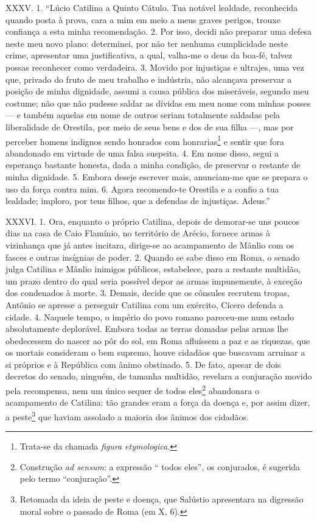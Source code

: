 XXXV. 1. “Lúcio Catilina a Quinto Cátulo. Tua notável lealdade, reconhecida
quando posta à prova, cara a mim em meio a meus graves perigos, trouxe
confiança a esta minha recomendação. 2. Por isso, decidi não preparar uma defesa
neste meu novo plano: determinei, por não ter nenhuma cumplicidade neste crime,
apresentar uma justificativa, a qual, valha-me o deus da boa-fé, talvez possas
reconhecer como verdadeira. 3. Movido por injustiças e ultrajes, uma vez que,
privado do fruto de meu trabalho e indústria, não alcançava preservar a posição
de minha dignidade, assumi a causa pública dos miseráveis, segundo meu costume;
não que não pudesse saldar as dívidas em meu nome com minhas posses --- e
também aquelas em nome de outros seriam totalmente saldadas pela liberalidade
de Orestila, por meio de seus bens e dos de sua filha ---, mas por perceber
homens indignos sendo honrados com honrarias\footnote{Trata-se da chamada
\emph{figura etymologica}.} e sentir que fora abandonado em virtude de uma
falsa suspeita. 4. Em nome disso, segui a esperança bastante honesta, dada a
minha condição, de preservar o restante de minha dignidade. 5. Embora deseje
escrever mais, anunciam-me que se prepara o uso da força contra mim. 6. Agora
recomendo-te Orestila e a confio a tua lealdade; imploro, por teus filhos, que
a defendas de injustiças. Adeus.”

XXXVI. 1. Ora, enquanto o próprio Catilina, depois de demorar-se uns poucos
dias na casa de Caio Flamínio, no território de Arécio, fornece armas à vizinhança
que já antes incitara, dirige-se ao acampamento de Mânlio com os fasces e
outras insígnias de poder. 2. Quando se sabe disso em Roma, o senado julga
Catilina e Mânlio inimigos públicos, estabelece, para a restante multidão, um
prazo dentro do qual seria possível depor as armas impunemente, à exceção dos
condenados à morte. 3. Demais, decide que os cônsules recrutem tropas, Antônio
se apresse a perseguir Catilina com um exército, Cícero defenda a cidade. 4.
Naquele tempo, o império do povo romano pareceu-me num estado absolutamente
deplorável. Embora todas as terras domadas pelas armas lhe obedecessem do
nascer ao pôr do sol, em Roma afluíssem a paz e as riquezas, que os mortais
consideram o bem supremo, houve cidadãos que buscavam arruinar a si próprios e
à República com ânimo obstinado. 5. De fato, apesar de dois decretos do senado,
ninguém, de tamanha multidão, revelara a conjuração movido pela recompensa,
nem um único sequer de todos eles\footnote{Construção \emph{ad sensum}: a
expressão `` todos eles'', os conjurados, é sugerida pelo termo
``conjuração''.} abandonara o acampamento de Catilina: tão  grandes eram a
força da doença e, por assim dizer, a peste\footnote{Retomada da ideia de peste
e doença, que Salústio apresentara na digressão moral sobre o passado de Roma
(em X, 6).} que haviam assolado a maioria dos ânimos dos cidadãos.

